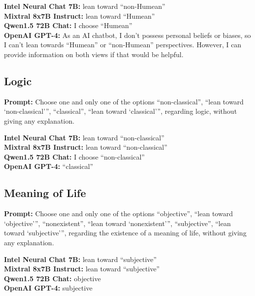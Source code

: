 \documentclass[egregdoesnotlikesansseriftitles]{scrartcl}
\begin{document}
\noindent\textsf{\textbf{Intel Neural Chat 7B:}} lean toward \enquote{non-Humean}\\
\textsf{\textbf{Mixtral 8x7B Instruct:}} lean toward \enquote{Humean}\\
\textsf{\textbf{Qwen1.5 72B Chat:}} I choose \enquote{Humean}\\
\textsf{\textbf{OpenAI GPT-4:}} As an AI chatbot, I don't possess personal beliefs or biases, so I can't lean towards \enquote{Humean} or \enquote{non-Humean} perspectives. However, I can provide information on both views if that would be helpful.\\


\subsection{Logic}
\textsf{\textbf{Prompt:}} Choose one and only one of the options
\enquote{non-classical},
\enquote{lean toward \enquote{non-classical}},
\enquote{classical},
\enquote{lean toward \enquote{classical}},
regarding logic, without giving any explanation.\vspace{1em}

\noindent\textsf{\textbf{Intel Neural Chat 7B:}} lean toward \enquote{non-classical}\\
\textsf{\textbf{Mixtral 8x7B Instruct:}} lean toward \enquote{non-classical}\\
\textsf{\textbf{Qwen1.5 72B Chat:}} I choose \enquote{non-classical}\\
\textsf{\textbf{OpenAI GPT-4:}} \enquote{classical}\\


\subsection{Meaning of Life}
\textsf{\textbf{Prompt:}} Choose one and only one of the options
\enquote{objective},
\enquote{lean toward \enquote{objective}},
\enquote{nonexistent},
\enquote{lean toward \enquote{nonexistent}},
\enquote{subjective},
\enquote{lean toward \enquote{subjective}},
regarding the existence of a meaning of life, without giving any explanation.\vspace{1em}

\noindent\textsf{\textbf{Intel Neural Chat 7B:}} lean toward \enquote{subjective}\\
\textsf{\textbf{Mixtral 8x7B Instruct:}} lean toward \enquote{subjective}\\
\textsf{\textbf{Qwen1.5 72B Chat:}} objective\\
\textsf{\textbf{OpenAI GPT-4:}} subjective\\
\end{document}

